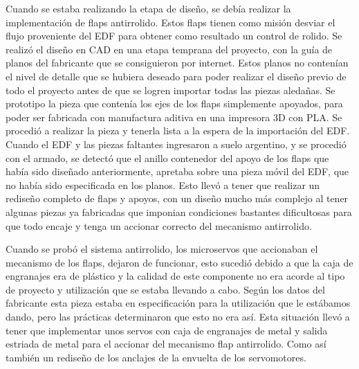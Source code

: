 Cuando se estaba realizando la etapa de diseño, se debía realizar la implementación de flaps antirrolido. Estos flaps tienen como misión desviar el flujo proveniente del EDF para obtener como resultado un control de rolido. Se realizó el diseño en CAD en una etapa temprana del proyecto, con la guía de planos del fabricante que se consiguieron por internet. Estos planos no contenían el nivel de detalle que se hubiera deseado para poder realizar el diseño previo de todo el proyecto antes de que se logren importar todas las piezas aledañas. Se prototipo la pieza que contenía los ejes de los flaps simplemente apoyados, para poder ser fabricada con manufactura aditiva en una impresora 3D con PLA. Se procedió a realizar la pieza y tenerla lista a la espera de la importación del EDF. Cuando el EDF y las piezas faltantes ingresaron a suelo argentino, y se procedió con el armado, se detectó que el anillo contenedor del apoyo de los flaps que había sido diseñado anteriormente, apretaba sobre una pieza móvil del EDF, que no había sido especificada en los planos. Esto llevó a tener que realizar un rediseño completo de flaps y apoyos, con un diseño mucho más complejo al tener algunas piezas ya fabricadas que imponian condiciones bastantes dificultosas para que todo encaje y tenga un accionar correcto del mecanismo antirrolido.

Cuando se probó el sistema antirrolido, los microservos que accionaban el mecanismo de los flaps, dejaron de funcionar, esto sucedió debido a que la caja de engranajes era de plástico y la calidad de este componente no era acorde al tipo de proyecto y utilización que se estaba llevando a cabo. Según los datos del fabricante esta pieza estaba en especificación para la utilización que le estábamos dando, pero las prácticas determinaron que esto no era así. Esta situación llevó a tener que implementar unos servos con caja de engranajes de metal y salida estriada de metal para el accionar del mecanismo flap antirrolido. Como así también un rediseño de los anclajes de la envuelta de los servomotores.
